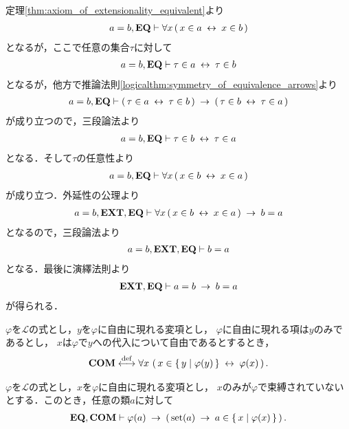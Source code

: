 	\begin{prf}
		定理\ref{thm:axiom_of_extensionality_equivalent}より
		\begin{align}
			a=b,\mbox{{\bf EQ}} \vdash \forall x\, (\, x \in a  \hspace{0.25em}\leftrightarrow\hspace{0.25em} x \in b\, )
		\end{align}
		となるが，ここで任意の集合$\tau$に対して
		\begin{align}
			a=b,\mbox{{\bf EQ}} \vdash \tau \in a \hspace{0.25em}\leftrightarrow\hspace{0.25em} \tau \in b
		\end{align}
		となるが，他方で推論法則\ref{logicalthm:symmetry_of_equivalence_arrows}より
		\begin{align}
			a=b,\mbox{{\bf EQ}} \vdash (\, \tau \in a \hspace{0.25em}\leftrightarrow\hspace{0.25em} \tau \in b\, )
				\hspace{0.25em}\rightarrow\hspace{0.25em} (\, \tau \in b \hspace{0.25em}\leftrightarrow\hspace{0.25em} \tau \in a\, )
		\end{align}
		が成り立つので，三段論法より
		\begin{align}
			a=b,\mbox{{\bf EQ}} \vdash \tau \in b \hspace{0.25em}\leftrightarrow\hspace{0.25em} \tau \in a
		\end{align}
		となる．そして$\tau$の任意性より
		\begin{align}
			a=b,\mbox{{\bf EQ}} \vdash \forall x\, (\, x \in b  \hspace{0.25em}\leftrightarrow\hspace{0.25em} x \in a\, )
		\end{align}
		が成り立つ．外延性の公理より
		\begin{align}
			a=b,\mbox{{\bf EXT}},\mbox{{\bf EQ}} \vdash \forall x\, (\, x \in b  \hspace{0.25em}\leftrightarrow\hspace{0.25em} x \in a\, )
			\hspace{0.25em}\rightarrow\hspace{0.25em} b = a
		\end{align}
		となるので，三段論法より
		\begin{align}
			a=b,\mbox{{\bf EXT}},\mbox{{\bf EQ}} \vdash b = a
		\end{align}
		となる．最後に演繹法則より
		\begin{align}
			\mbox{{\bf EXT}},\mbox{{\bf EQ}} \vdash a = b \hspace{0.25em}\rightarrow\hspace{0.25em} b = a
		\end{align}
		が得られる．
		\QED
	\end{prf}
	
	\begin{screen}
		\begin{axm}[内包性公理] 
			$\varphi$を$\mathcal{L}$の式とし，$y$を$\varphi$に自由に現れる変項とし，
			$\varphi$に自由に現れる項は$y$のみであるとし，
			$x$は$\varphi$で$y$への代入について自由であるとするとき，
			\begin{align}
				\mbox{\bf COM} \overset{\mathrm{def}}{\longleftrightarrow} \forall x\, \left(\, x \in \left\{\, y \mid \varphi(y)\, \right\} \hspace{0.25em}\leftrightarrow\hspace{0.25em} \varphi(x)\, \right).
			\end{align}
		\end{axm}
	\end{screen}
	
	\begin{screen}
		\begin{thm}[条件を満たす集合は要素である]\label{thm:satisfactory_set_is_an_element}
			$\varphi$を$\mathcal{L}$の式とし，$x$を$\varphi$に自由に現れる変項とし，
			$x$のみが$\varphi$で束縛されていないとする．このとき，任意の類$a$に対して
			\begin{align}
				\mbox{{\bf EQ}},\mbox{\bf COM} \vdash \varphi(a) \hspace{0.25em}\rightarrow\hspace{0.25em} 
				\left(\, \operatorname*{set} (a) \hspace{0.25em}\rightarrow\hspace{0.25em} a \in \left\{\, x \mid \varphi(x)\, \right\}\, \right).
			\end{align}
		\end{thm}
	\end{screen}
	
